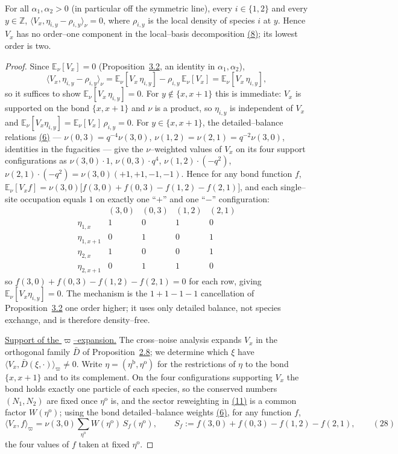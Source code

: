 \documentclass[11pt]{article}
\theoremstyle{plain}
\theoremstyle{definition}
\theoremstyle{remark}
\newcommand{\Z}{\mathbb{Z}}\newcommand{\R}{\mathbb{R}}\newcommand{\N}{\mathbb{N}}
\newcommand{\E}{\mathbb{E}}\newcommand{\PP}{\mathbb{P}}\newcommand{\dd}{\,\mathrm{d}}
\newcommand{\ip}[2]{\langle #1,#2\rangle_\nu}\newcommand{\bone}{\mathbf 1}
\begin{document}
For all $\alpha_1,\alpha_2>0$ (in particular off the symmetric line), every
$i\in\{1,2\}$ and every $y\in\Z$, $\ip{V_x}{\eta_{i,y}-\rho_{i,y}}=0$, where
$\rho_{i,y}$ is the local density of species $i$ at $y$. Hence $V_x$ has no order--one
component in the local--basis decomposition \hyperref[eq_Dfac]{(8)}; its lowest order is two.
\par
\begin{proof}
Since $\E_\nu[V_x]=0$ (Proposition~\hyperref[prop_cross]{3.2}, an identity in $\alpha_1,\alpha_2$),
\[
  \ip{V_x}{\eta_{i,y}-\rho_{i,y}}=\E_\nu[V_x\,\eta_{i,y}]-\rho_{i,y}\,\E_\nu[V_x]
  =\E_\nu[V_x\,\eta_{i,y}],
\]
so it suffices to show $\E_\nu[V_x\,\eta_{i,y}]=0$. For $y\notin\{x,x+1\}$ this is
immediate: $V_x$ is supported on the bond $\{x,x+1\}$ and $\nu$ is a product, so
$\eta_{i,y}$ is independent of $V_x$ and $\E_\nu[V_x\eta_{i,y}]=\E_\nu[V_x]\,\rho_{i,y}=0$.
For $y\in\{x,x+1\}$, the detailed--balance relations \hyperref[eq_dbrel]{(6)} ---
$\nu(0,3)=q^{-4}\nu(3,0)$, $\nu(1,2)=\nu(2,1)=q^{-2}\nu(3,0)$, identities in the
fugacities --- give the $\nu$--weighted values of $V_x$ on its four support
configurations as $\nu(3,0)\cdot1$, $\nu(0,3)\cdot q^4$, $\nu(1,2)\cdot(-q^2)$,
$\nu(2,1)\cdot(-q^2)=\nu(3,0)(+1,+1,-1,-1)$. Hence for any bond function $f$,
$\E_\nu[V_x f]=\nu(3,0)\big[f(3,0)+f(0,3)-f(1,2)-f(2,1)\big]$, and each single--site
occupation equals $1$ on exactly one ``$+$'' and one ``$-$'' configuration:
\[
  \begin{array}{c|cccc}
   & (3,0) & (0,3) & (1,2) & (2,1)\\\hline
   \eta_{1,x}   & 1 & 0 & 1 & 0\\
   \eta_{1,x+1} & 0 & 1 & 0 & 1\\
   \eta_{2,x}   & 1 & 0 & 0 & 1\\
   \eta_{2,x+1} & 0 & 1 & 1 & 0
  \end{array}
\]
so $f(3,0)+f(0,3)-f(1,2)-f(2,1)=0$ for each row, giving $\E_\nu[V_x\eta_{i,y}]=0$. The
mechanism is the $1+1-1-1$ cancellation of Proposition~\hyperref[prop_cross]{3.2} one order
higher; it uses only detailed balance, not species exchange, and is therefore
density--free.

\underline{Support of the $\varpi$--expansion.} The cross--noise analysis expands $V_x$ in the
orthogonal family $\bar D$ of Proposition~\hyperref[prop_orth]{2.8}; we determine which $\xi$ have
$\langle V_x,\bar D(\xi,\cdot)\rangle_\varpi\ne0$. Write
$\eta=(\eta^{\mathrm b},\eta^{\mathrm o})$ for the restrictions of $\eta$ to the bond
$\{x,x+1\}$ and to its complement. On the four configurations supporting $V_x$ the bond
holds exactly one particle of each species, so the conserved numbers $(N_1,N_2)$ are
fixed once $\eta^{\mathrm o}$ is, and the sector reweighting in \hyperref[eq_omegadef]{(11)} is a
common factor $W(\eta^{\mathrm o})$; using the bond detailed--balance weights
\hyperref[eq_dbrel]{(6)}, for any function $f$,
\label{eq_Vorthid}
\begin{equation}
  \langle V_x,f\rangle_\varpi=\nu(3,0)\sum_{\eta^{\mathrm o}}W(\eta^{\mathrm o})\,
  S_f(\eta^{\mathrm o}),\qquad
  S_f:=f(3,0)+f(0,3)-f(1,2)-f(2,1),\qquad(28)
\end{equation}
the four values of $f$ taken at fixed $\eta^{\mathrm o}$.


\end{proof}
\end{document}
